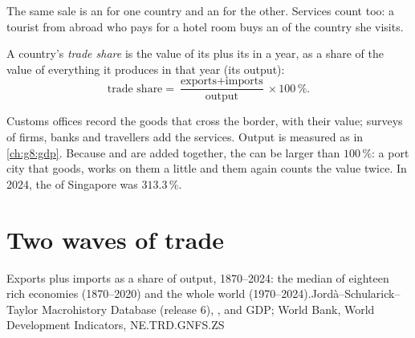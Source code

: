 The same sale is an  for one country and an  for the other. Services
count too: a tourist from abroad who pays for a hotel room buys an  of the
country she visits.

\begin{definition}\label{def:g6:a-connected-world:trade-share}
A country's \emph{trade share} is the value of its 
plus its  in a year, as a share of the value of everything it produces
in that year (its output):
\[
  \text{trade share} = \frac{\text{exports} + \text{imports}}{\text{output}}
  \times 100\,\%.
\]
\end{definition}

\begin{measure}
Customs offices record the goods that cross the border, with their value;
surveys of firms, banks and travellers add the services. Output is measured as
in \cref{ch:g8:gdp}. Because  and  are added together, the  can be larger than $100\,\%$: a port city that  goods, works on
them a little and  them again counts the value twice. In 2024, the  of Singapore was $313.3\,\%$.
\end{measure}


\section{Two waves of trade}

\begin{omchart}{Exports plus imports as a share of output, 1870--2024: the
median of eighteen rich economies (1870--2020) and the whole world
(1970--2024).}{Jord\`a--Schularick--Taylor Macrohistory Database (release 6),
,  and GDP; World Bank, World Development Indicators,
NE.TRD.GNFS.ZS}
\end{omchart}

